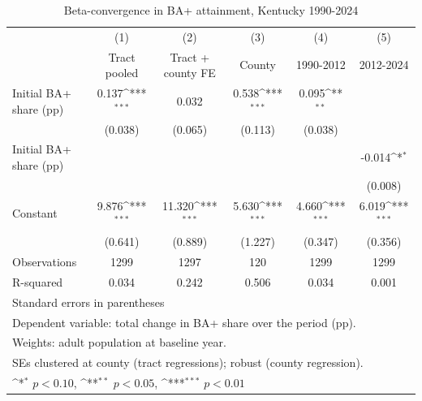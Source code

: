 \begin{table}[htbp]\centering
\def\sym#1{\ifmmode^{#1}\else\(^{#1}\)\fi}
\caption{Beta-convergence in BA+ attainment, Kentucky 1990-2024}
\begin{tabular}{l*{5}{c}}
\toprule
            &\multicolumn{1}{c}{(1)}&\multicolumn{1}{c}{(2)}&\multicolumn{1}{c}{(3)}&\multicolumn{1}{c}{(4)}&\multicolumn{1}{c}{(5)}\\
            &\multicolumn{1}{c}{Tract pooled}&\multicolumn{1}{c}{Tract + county FE}&\multicolumn{1}{c}{County}&\multicolumn{1}{c}{1990-2012}&\multicolumn{1}{c}{2012-2024}\\
\midrule
Initial BA+ share (pp)&       0.137\sym{***}&       0.032         &       0.538\sym{***}&       0.095\sym{**} &                     \\
            &     (0.038)         &     (0.065)         &     (0.113)         &     (0.038)         &                     \\
\addlinespace
Initial BA+ share (pp)&                     &                     &                     &                     &      -0.014\sym{*}  \\
            &                     &                     &                     &                     &     (0.008)         \\
\addlinespace
Constant    &       9.876\sym{***}&      11.320\sym{***}&       5.630\sym{***}&       4.660\sym{***}&       6.019\sym{***}\\
            &     (0.641)         &     (0.889)         &     (1.227)         &     (0.347)         &     (0.356)         \\
\midrule
Observations&        1299         &        1297         &         120         &        1299         &        1299         \\
R-squared   &       0.034         &       0.242         &       0.506         &       0.034         &       0.001         \\
\bottomrule
\multicolumn{6}{l}{\footnotesize Standard errors in parentheses}\\
\multicolumn{6}{l}{\footnotesize Dependent variable: total change in BA+ share over the period (pp).}\\
\multicolumn{6}{l}{\footnotesize Weights: adult population at baseline year.}\\
\multicolumn{6}{l}{\footnotesize SEs clustered at county (tract regressions); robust (county regression).}\\
\multicolumn{6}{l}{\footnotesize \sym{*} \(p<0.10\), \sym{**} \(p<0.05\), \sym{***} \(p<0.01\)}\\
\end{tabular}
\end{table}
